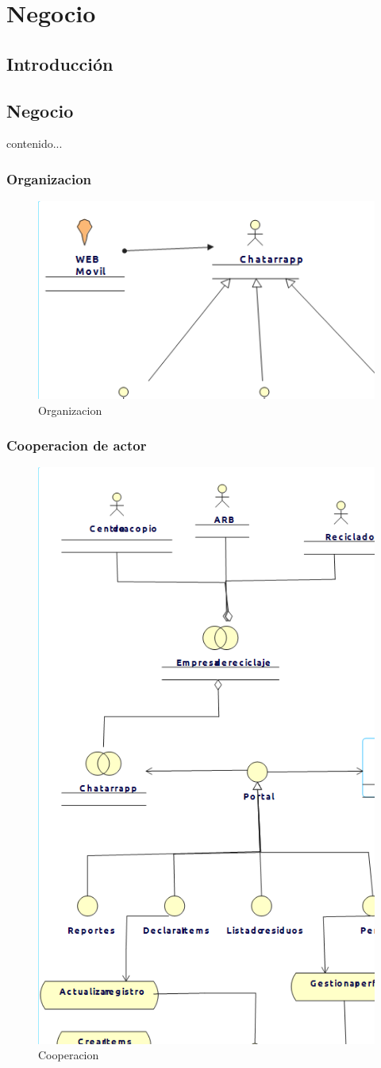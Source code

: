 \chapter{Negocio}

\section{Introducción}

\newpage

\section{Negocio}
contenido...

\subsection{Organizacion}
\begin{figure}[h!]
	\centering
	\includegraphics[width=0.8\linewidth]{Arquitectura/Negocio/imgs/Organizacion.png}
	\caption{Organizacion}
\end{figure}
\newpage

\subsection{Cooperacion de actor}
\begin{figure}[h!]
	\centering
	\includegraphics[width=0.4\linewidth]{Arquitectura/Negocio/imgs/Cooperacion de actor.png}
	\caption{Cooperacion}
\end{figure}
\newpage

